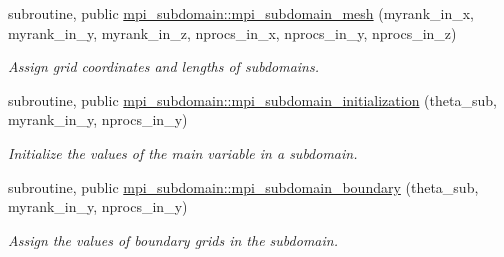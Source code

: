 \begin{DoxyCompactItemize}
subroutine, public \mbox{\hyperlink{namespacempi__subdomain_a612331eead74041f174ece9a572c7427}{mpi\+\_\+subdomain\+::mpi\+\_\+subdomain\+\_\+mesh}} (myrank\+\_\+in\+\_\+x, myrank\+\_\+in\+\_\+y, myrank\+\_\+in\+\_\+z, nprocs\+\_\+in\+\_\+x, nprocs\+\_\+in\+\_\+y, nprocs\+\_\+in\+\_\+z)
\begin{DoxyCompactList}\small\item\em Assign grid coordinates and lengths of subdomains. \end{DoxyCompactList}\item 
subroutine, public \mbox{\hyperlink{namespacempi__subdomain_a7cc0deb85b84358eb7addeea849733c4}{mpi\+\_\+subdomain\+::mpi\+\_\+subdomain\+\_\+initialization}} (theta\+\_\+sub, myrank\+\_\+in\+\_\+y, nprocs\+\_\+in\+\_\+y)
\begin{DoxyCompactList}\small\item\em Initialize the values of the main variable in a subdomain. \end{DoxyCompactList}\item 
subroutine, public \mbox{\hyperlink{namespacempi__subdomain_a55659431068678c08d21847338390ea8}{mpi\+\_\+subdomain\+::mpi\+\_\+subdomain\+\_\+boundary}} (theta\+\_\+sub, myrank\+\_\+in\+\_\+y, nprocs\+\_\+in\+\_\+y)
\begin{DoxyCompactList}\small\item\em Assign the values of boundary grids in the subdomain. \end{DoxyCompactList}\end{DoxyCompactItemize}
